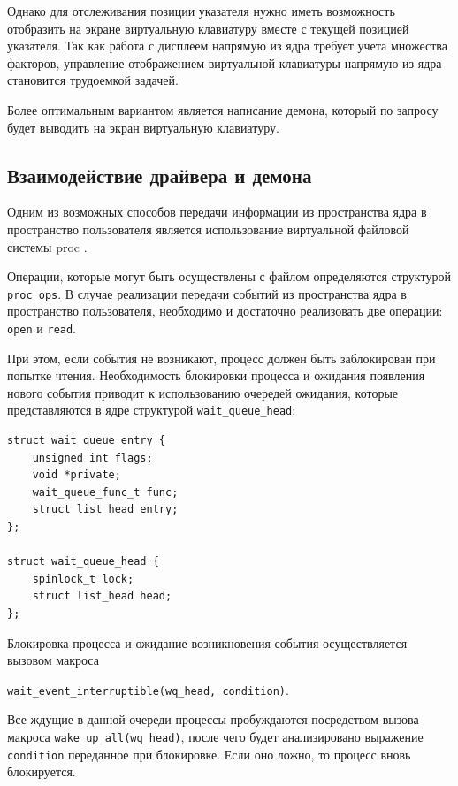 Однако для отслеживания позиции указателя нужно иметь возможность отобразить на экране виртуальную клавиатуру вместе с текущей позицией указателя. Так как работа с дисплеем напрямую из ядра требует учета множества факторов, управление отображением виртуальной клавиатуры напрямую из ядра становится трудоемкой задачей.

Более оптимальным вариантом является написание демона, который по запросу будет выводить на экран виртуальную клавиатуру.

\subsection{Взаимодействие драйвера и демона}

Одним из возможных способов передачи информации из пространства ядра в пространство пользователя является использование виртуальной файловой системы proc \cite{vfs-proc}.

Операции, которые могут быть осуществлены с файлом определяются структурой \texttt{proc\_ops}. В случае реализации передачи событий из пространства ядра в пространство пользователя, необходимо и достаточно реализовать две операции: \texttt{open} и \texttt{read}.

При этом, если события не возникают, процесс должен быть заблокирован при попытке чтения. Необходимость блокировки процесса и ожидания появления нового события приводит к использованию очередей ожидания, которые представляются в ядре структурой \texttt{wait\_queue\_head}:

\begin{small}
\begin{verbatim}
struct wait_queue_entry {
    unsigned int flags;
    void *private;
    wait_queue_func_t func;
    struct list_head entry;
};

struct wait_queue_head {
    spinlock_t lock;
    struct list_head head;
};
\end{verbatim}
\end{small}

Блокировка процесса и ожидание возникновения события осуществляется вызовом макроса

\texttt{wait\_event\_interruptible(wq\_head, condition)}.

Все ждущие в данной очереди процессы пробуждаются посредством вызова макроса \texttt{wake\_up\_all(wq\_head)}, после чего будет анализировано выражение \texttt{condition} переданное при блокировке. Если оно ложно, то процесс вновь блокируется.

